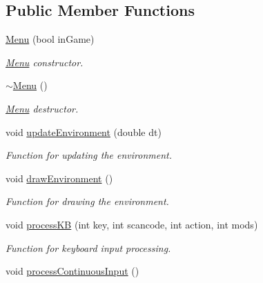 \subsection*{Public Member Functions}
\begin{DoxyCompactItemize}
\item 
\hyperlink{class_menu_a7570644ca93aaf710f7ded2e20e36186}{Menu} (bool in\+Game)\hypertarget{class_menu_a7570644ca93aaf710f7ded2e20e36186}{}\label{class_menu_a7570644ca93aaf710f7ded2e20e36186}

\begin{DoxyCompactList}\small\item\em \hyperlink{class_menu}{Menu} constructor. \end{DoxyCompactList}\item 
\hyperlink{class_menu_a831387f51358cfb88cd018e1777bc980}{$\sim$\+Menu} ()\hypertarget{class_menu_a831387f51358cfb88cd018e1777bc980}{}\label{class_menu_a831387f51358cfb88cd018e1777bc980}

\begin{DoxyCompactList}\small\item\em \hyperlink{class_menu}{Menu} destructor. \end{DoxyCompactList}\item 
void \hyperlink{class_menu_a1efe72e89e793c1c6f67d16c513499e1}{update\+Environment} (double dt)
\begin{DoxyCompactList}\small\item\em Function for updating the environment. \end{DoxyCompactList}\item 
void \hyperlink{class_menu_ac1403e071d911bf4c3b43d344d46ee4f}{draw\+Environment} ()\hypertarget{class_menu_ac1403e071d911bf4c3b43d344d46ee4f}{}\label{class_menu_ac1403e071d911bf4c3b43d344d46ee4f}

\begin{DoxyCompactList}\small\item\em Function for drawing the environment. \end{DoxyCompactList}\item 
void \hyperlink{class_menu_a936bec79e70b42707578af8f7d7bc1b2}{process\+KB} (int key, int scancode, int action, int mods)
\begin{DoxyCompactList}\small\item\em Function for keyboard input processing. \end{DoxyCompactList}\item 
void \hyperlink{class_menu_a2ff354c6e9693f559f3778d78a34e405}{process\+Continuous\+Input} ()\hypertarget{class_menu_a2ff354c6e9693f559f3778d78a34e405}{}\label{class_menu_a2ff354c6e9693f559f3778d78a34e405}


\end{DoxyCompactItemize}
